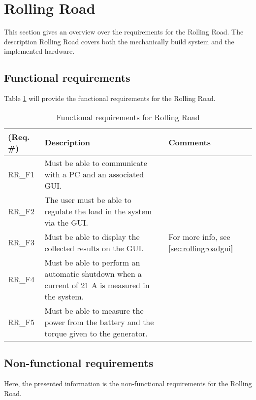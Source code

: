 \section{Rolling Road}
This section gives an overview over the requirements for the Rolling Road. The description Rolling Road covers both the mechanically build system and the implemented hardware.

\subsection{Functional requirements}
Table \ref{Functional:Rolling Road} will provide the functional requirements for the Rolling Road.

\begin{table}[h!]
	\centering
	\begin{tabular}{|p{2 cm}|p{7 cm}|p{4 cm}|}
	\hline
	\textbf{(Req. \#)} & \textbf{Description} & \textbf{Comments} \\\hline
	RR\_F1	& Must be able to communicate with a PC and an associated GUI. &   \\\hline
	RR\_F2	& The user must be able to regulate the load in the system via the GUI. &   \\\hline
	RR\_F3	& Must be able to display the collected results on the GUI. & For more info, see \ref{sec:rollingroadgui}  \\\hline
	RR\_F4	& Must be able to perform an automatic shutdown when a current of 21 A is measured in the system. &   \\\hline
	RR\_F5	& Must be able to measure the power from the battery and the torque given to the generator. &   \\\hline
	\end{tabular}
	\label{Functional:Rolling Road}
	\caption{Functional requirements for Rolling Road}
\end{table}

\subsection{Non-functional requirements}
Here, the presented information is the non-functional requirements for the Rolling Road.

